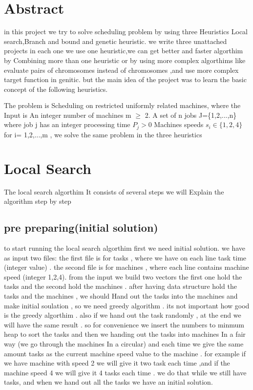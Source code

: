 \documentclass[11pt,fullpage]{article}
\begin{document}
\date{}

\maketitle

\section{Abstract}

in this project we try to solve scheduling problem by using three Heuristics Local search,Branch and bound and genetic heuristic. we write three unattached projects in each one we use one heuristic,we can get better  and faster algorthim by Combining more than one heuristic or by using more complex algorthims like evaluate pairs of chromosomes instead of chromosomes ,and use more complex target function in genitic. but the main idea of the project was to learn the basic concept of the following heuristics.\newline

The problem is Scheduling on restricted uniformly related machines, where the Input is An integer number of machines m $\geq$ 2. A set of n jobs J=\{1,2,...,n\} 
where job j has an integer processing time  $P_j > 0$ Machines speeds $s_i \in \{1,2,4\}$  for i= 1,2,...,m , we solve the same problem in the three heuristics
\section{Local Search}
The local search algorthim It consists of several steps we will Explain the algorithm step by step
\subsection{pre preparing(initial solution)}
to start running the local search algorthim  first we need initial solution. we have as input two files: the first file is for tasks , where we have on each line  task time (integer value) .  the second file is for machines , where each line contains machine speed    (integer 1,2,4). from the input we build two vectors the first one hold the tasks and the second hold the machines . after having data structure hold the tasks and the machines , we should Hand out the tasks into  the machines and make initial soulation , so we need  greedy algorithm . its not important how good is the greedy algorthim . also if we hand out the task randomly , at the end we will have the same result .  so for convenience we insert the numbers to minmum heap  to sort the tasks and then we handing out the tasks into machines In a fair way (we go through the machines In a circular) and  each time  we give the same amount tasks as the current machine speed value to the machine . for example if we have machine with speed 2 we will give it two task each time ,and if the machine speed 4 we will give it 4 tasks each time . we do that while we still have tasks, and when we hand out all the tasks
we have an initial solution.
\end{document}
